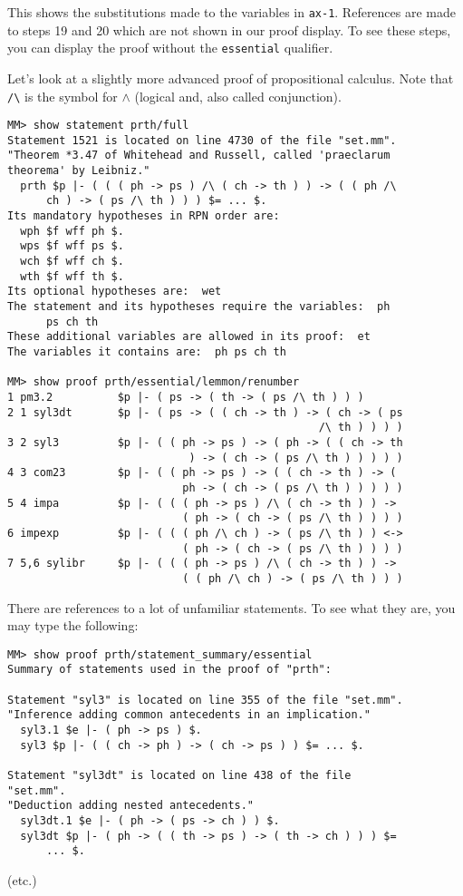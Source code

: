 This shows the substitutions made to the variables in \texttt{ax-1}.  References are made to
steps 19 and 20 which are not shown in our proof display.  To see these steps,
you can display the proof without the \texttt{essential} qualifier.

Let's look at a slightly more advanced proof of propositional calculus.  Note
that \verb+/\+ is the symbol for $\wedge$ (logical {\sc and}, also
called conjunction).

\begin{verbatim}
MM> show statement prth/full
Statement 1521 is located on line 4730 of the file "set.mm".
"Theorem *3.47 of Whitehead and Russell, called 'praeclarum
theorema' by Leibniz."
  prth $p |- ( ( ( ph -> ps ) /\ ( ch -> th ) ) -> ( ( ph /\
      ch ) -> ( ps /\ th ) ) ) $= ... $.
Its mandatory hypotheses in RPN order are:
  wph $f wff ph $.
  wps $f wff ps $.
  wch $f wff ch $.
  wth $f wff th $.
Its optional hypotheses are:  wet
The statement and its hypotheses require the variables:  ph
      ps ch th
These additional variables are allowed in its proof:  et
The variables it contains are:  ph ps ch th

MM> show proof prth/essential/lemmon/renumber
1 pm3.2          $p |- ( ps -> ( th -> ( ps /\ th ) ) )
2 1 syl3dt       $p |- ( ps -> ( ( ch -> th ) -> ( ch -> ( ps
                                                /\ th ) ) ) )
3 2 syl3         $p |- ( ( ph -> ps ) -> ( ph -> ( ( ch -> th
                            ) -> ( ch -> ( ps /\ th ) ) ) ) )
4 3 com23        $p |- ( ( ph -> ps ) -> ( ( ch -> th ) -> (
                           ph -> ( ch -> ( ps /\ th ) ) ) ) )
5 4 impa         $p |- ( ( ( ph -> ps ) /\ ( ch -> th ) ) ->
                           ( ph -> ( ch -> ( ps /\ th ) ) ) )
6 impexp         $p |- ( ( ( ph /\ ch ) -> ( ps /\ th ) ) <->
                           ( ph -> ( ch -> ( ps /\ th ) ) ) )
7 5,6 sylibr     $p |- ( ( ( ph -> ps ) /\ ( ch -> th ) ) ->
                           ( ( ph /\ ch ) -> ( ps /\ th ) ) )
\end{verbatim}

There are references to a lot of unfamiliar statements.  To see what they are,
you may type the following:

\begin{verbatim}
MM> show proof prth/statement_summary/essential
Summary of statements used in the proof of "prth":

Statement "syl3" is located on line 355 of the file "set.mm".
"Inference adding common antecedents in an implication."
  syl3.1 $e |- ( ph -> ps ) $.
  syl3 $p |- ( ( ch -> ph ) -> ( ch -> ps ) ) $= ... $.

Statement "syl3dt" is located on line 438 of the file
"set.mm".
"Deduction adding nested antecedents."
  syl3dt.1 $e |- ( ph -> ( ps -> ch ) ) $.
  syl3dt $p |- ( ph -> ( ( th -> ps ) -> ( th -> ch ) ) ) $=
      ... $.
\end{verbatim}
\begin{center}
(etc.)
\end{center}

